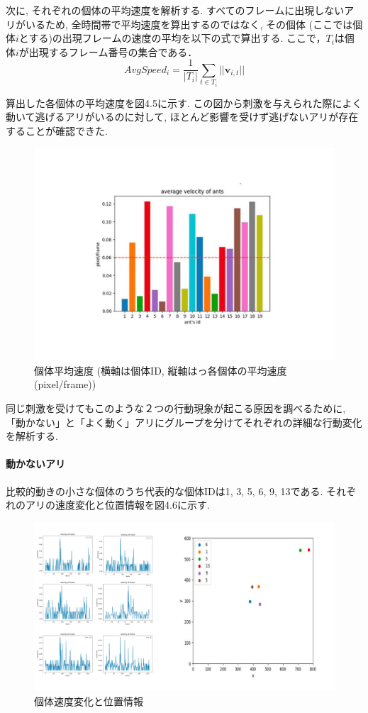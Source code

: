 ﻿\documentclass[a4paper, 12pt]{jsreport}
\begin{document}
次に, それぞれの個体の平均速度を解析する. すべてのフレームに出現しないアリがいるため, 全時間帯で平均速度を算出するのではなく, その個体 (ここでは個体$i$とする)の出現フレームの速度の平均を以下の式で算出する. ここで，$T_i$は個体$i$が出現するフレーム番号の集合である． $$AvgSpeed_i =\frac{1}{|T_i|}\sum_{t\in{T_i}}||\bm{v}_{i,t}|| $$

算出した各個体の平均速度を図4.5に示す. この図から刺激を与えられた際によく動いて逃げるアリがいるのに対して, ほとんど影響を受けず逃げないアリが存在することが確認できた. 
\begin{figure}[tbp]
\centering
\includegraphics[width=13cm,  keepaspectratio]{kotaivelo.pdf}
\caption[Short figure caption for List of Figures]{個体平均速度 (横軸は個体ID, 縦軸はっ各個体の平均速度 (pixel/frame))}
\label{fig:paper1_fig12}
\end{figure}
同じ刺激を受けてもこのような２つの行動現象が起こる原因を調べるために, 「動かない」と「よく動く」アリにグループを分けてそれぞれの詳細な行動変化を解析する. 
\paragraph{動かないアリ}
比較的動きの小さな個体のうち代表的な個体IDは1,  3,  5,  6,  9,  13である. それぞれのアリの速度変化と位置情報を図4.6に示す. 
\begin{figure}[tbp]
\centering
\includegraphics[width=13cm,  keepaspectratio]{nigenai.pdf}
\caption[Short figure caption for List of Figures]{個体速度変化と位置情報}
\label{fig:paper1_fig13}
\end{figure}
\end{document}
